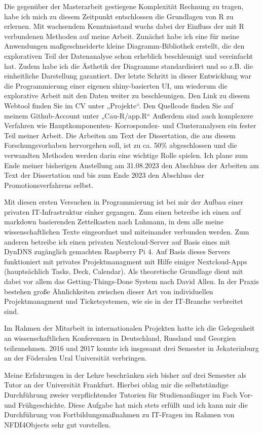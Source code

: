 \documentclass[10pt, a4paper]{article}
\begin{document}
Die gegenüber der Masterarbeit gestiegene Komplexität Rechnung zu tragen, habe ich mich zu diesem Zeitpunkt entschlossen die Grundlagen von R zu erlernen. Mit wachsendem Kenntnisstand wuchs dabei der Einfluss der mit R verbundenen Methoden auf meine Arbeit. Zunächst habe ich eine für meine Anwendungen maßgeschneiderte kleine Diagramm-Bibliothek erstellt, die den explorativen Teil der Datenanalyse schon erheblich beschleunigt und vereinfacht hat. Zudem habe ich die Ästhetik der Diagramme standardisiert und so z.B. die einheitliche Darstellung garantiert. Der letzte Schritt in dieser Entwicklung war die Programmierung einer eigenen shiny-basierten UI, um wiederum die explorative Arbeit mit den Daten weiter zu beschleunigen. Den Link zu diesem Webtool finden Sie im CV unter „Projekte“. Den Quellcode finden Sie auf meinem Github-Account unter „Cau-R/app.R“ Außerdem sind auch komplexere Verfahren wie Hauptkomponenten- Korrospondez- und Clusteranalysen ein fester Teil meiner Arbeit. Die Arbeiten am Text der Dissertation, die aus diesem Forschungsvorhaben hervorgehen soll, ist zu ca. 50\% abgeschlossen und die verwandten Methoden werden darin eine wichtige Rolle spielen. Ich plane zum Ende meiner bisherigen Anstellung am 31.08.2023 den Abschluss der Arbeiten am Text der Dissertation und bis zum Ende 2023 den Abschluss der Promotionsverfahrens selbst.

Mit diesen ersten Versuchen in Programmierung ist bei mir der Aufbau einer privaten IT-Infrastruktur einher gegangen. Zum einen betreibe ich einen auf markdown basierenden Zettelkasten nach Luhmann, in dem alle meine wissenschaftlichen Texte eingeordnet und miteinander verbunden werden. Zum anderen betreibe ich einen privaten Nextcloud-Server auf Basis eines mit DynDNS zugänglich gemachten Raspberry Pi 4. Auf Basis dieses Servers funktioniert mit privates Projektmanagment mit Hilfe einiger Nextcloud-Apps (hauptsächlich Tasks, Deck, Calendar). Als theoretische Grundlage dient mit dabei vor allem das Getting-Things-Done System nach David Allen. In der Praxis bestehen große Ähnlichkeiten zwischen dieser Art von individuellen Projektmanagment und Ticketsystemen, wie sie in der IT-Branche verbreitet sind.

Im Rahmen der Mitarbeit in internationalen Projekten hatte ich die Gelegenheit an wissenschaftlichen Konferenzen in Deutschland, Russland und Georgien teilzunehmen. 2016 und 2017 konnte ich insgesamt drei Semester in Jekaterinburg an der Föderalen Ural Universität verbringen.

Meine Erfahrungen in der Lehre beschränken sich bisher auf drei Semester als Tutor an der Universität Frankfurt. Hierbei oblag mir die selbstständige Durchführung zweier verpflichtender Tutorien für Studienanfänger im Fach Vor- und Frühgeschichte. Diese Aufgabe hat mich stets erfüllt und ich kann mir die Durchführung von Fortbildungsmaßnahmen zu IT-Fragen im Rahmen von NFDI4Objects sehr gut vorstellen.
\end{document}
